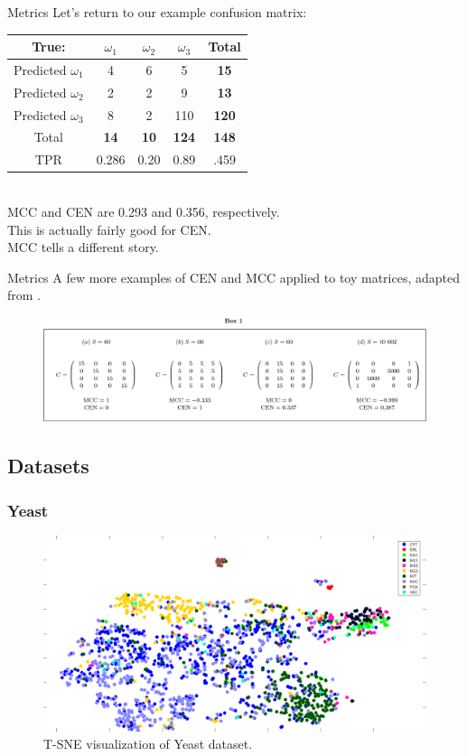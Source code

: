 \documentclass{beamer}
\begin{document}
\begin{frame}{Metrics}
	Let's return to our example confusion matrix: \\\begin{tabular}{|c|c|c|c|c|}
		\hline
		True:&$\omega_1$&$\omega_2$&$\omega_3$&\textbf{Total}\\
		\hline
		Predicted $\omega_1$&4&6&5&\textbf{15}\\
		\hline
		Predicted $\omega_2$&2&2&9&\textbf{13}\\
		\hline
		Predicted $\omega_3$&8&2&110&\textbf{120}\\
		\hline
		Total&\textbf{14}&\textbf{10}&\textbf{124}&\textbf{148}\\
		TPR&0.286&0.20&0.89&.459\\
		\hline
	\end{tabular} 
	\\MCC and CEN are 0.293 and 0.356, respectively.\\
	This is actually fairly good for CEN.\\
	MCC tells a different story.
\end{frame}
\begin{frame}{Metrics}
	A few more examples of CEN and MCC applied to toy matrices, adapted from \cite{wei_novel_2010}.
	\begin{figure}
		\centering
		\includegraphics[width=0.7\linewidth]{figures/png/MCCCENComparison}
		\label{fig:mcccencomparison}
	\end{figure}
	
\end{frame}
\subsection{Datasets}
\subsubsection{Yeast}
\begin{frame}
	\begin{figure}
		\centering
		\includegraphics[width=0.9\linewidth]{figures/png/YeastTSNE}
		\caption[T-SNE visualization of Yeast dataset]{T-SNE visualization of Yeast dataset.}
		\label{fig:yeasttsne}
	\end{figure}
	
\end{frame}
\end{document}
